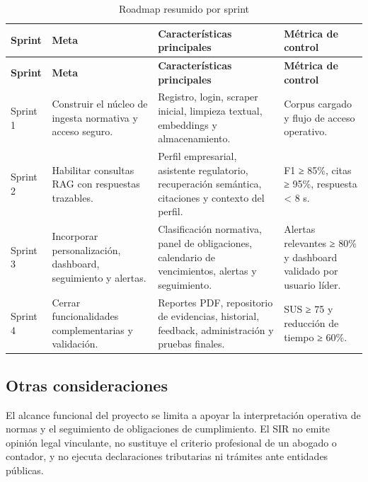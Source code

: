 \documentclass[12pt,a4paper,oneside]{report}
\begin{document}
\begin{longtable}{p{}p{}p{}p{}}
\caption{Roadmap resumido por sprint}\label{tab:cap3-roadmap-sprint}\\
\toprule
\textbf{Sprint} & \textbf{Meta} & \textbf{Características principales} & \textbf{Métrica de control} \\
\midrule
\endfirsthead
\toprule
\textbf{Sprint} & \textbf{Meta} & \textbf{Características principales} & \textbf{Métrica de control} \\
\midrule
\endhead
Sprint 1 & Construir el núcleo de ingesta normativa y acceso seguro. & Registro, login, scraper inicial, limpieza textual, embeddings y almacenamiento. & Corpus cargado y flujo de acceso operativo. \\
Sprint 2 & Habilitar consultas RAG con respuestas trazables. & Perfil empresarial, asistente regulatorio, recuperación semántica, citaciones y contexto del perfil. & F1 ≥ 85\%, citas ≥ 95\%, respuesta < 8 s. \\
Sprint 3 & Incorporar personalización, dashboard, seguimiento y alertas. & Clasificación normativa, panel de obligaciones, calendario de vencimientos, alertas y seguimiento. & Alertas relevantes ≥ 80\% y dashboard validado por usuario líder. \\
Sprint 4 & Cerrar funcionalidades complementarias y validación. & Reportes PDF, repositorio de evidencias, historial, feedback, administración y pruebas finales. & SUS ≥ 75 y reducción de tiempo ≥ 60\%. \\
\bottomrule
\end{longtable}

\subsection{Otras consideraciones}\label{subsec:otras-consideraciones}

El alcance funcional del proyecto se limita a apoyar la interpretación operativa de normas y el seguimiento de obligaciones de cumplimiento. El SIR no emite opinión legal vinculante, no sustituye el criterio profesional de un abogado o contador, y no ejecuta declaraciones tributarias ni trámites ante entidades públicas.
\end{document}

